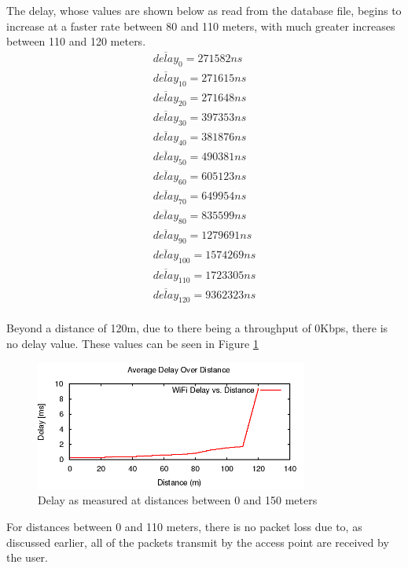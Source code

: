 The delay, whose values are shown below as read from the database file, begins
to increase at a faster rate between 80 and 110 meters, with much greater
increases between 110 and 120 meters.
\begin{gather*}
	\overline{delay}_0=271582ns \\
	\overline{delay}_{10}=271615ns \\
	\overline{delay}_{20}=271648ns \\
	\overline{delay}_{30}=397353ns \\
	\overline{delay}_{40}=381876ns \\
	\overline{delay}_{50}=490381ns \\
	\overline{delay}_{60}=605123ns \\
	\overline{delay}_{70}=649954ns \\
	\overline{delay}_{80}=835599ns \\
	\overline{delay}_{90}=1279691ns \\
	\overline{delay}_{100}=1574269ns \\
	\overline{delay}_{110}=1723305ns \\
	\overline{delay}_{120}=9362323ns \\
\end{gather*}

Beyond a distance of 120m, due to there being a throughput of 0Kbps, there is no
delay value. These values can be seen in Figure \ref{fig:QBdelay}

\begin{figure}[H]
	\centering
	\includegraphics[width=0.8\textwidth]{images/EE500/QB/Images/wifi-delay}
	\caption{Delay as measured at distances between 0 and 150 meters}
	\label{fig:QBdelay}
\end{figure}

For distances between 0 and 110 meters, there is no packet loss due to, as discussed
earlier, all of the packets transmit by the access point are received by the
user.

